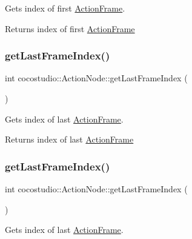Gets index of first \hyperlink{classcocostudio_1_1ActionFrame}{Action\+Frame}.

\begin{DoxyReturn}{Returns}
index of first \hyperlink{classcocostudio_1_1ActionFrame}{Action\+Frame} 
\end{DoxyReturn}
\mbox{\label{classcocostudio_1_1ActionNode_a4f5f69fc0b097ab421ce518b10f316c1}} 
\subsubsection{\texorpdfstring{get\+Last\+Frame\+Index()}{getLastFrameIndex()}\hspace{0.1cm}{\footnotesize\ttfamily [1/2]}}
{\footnotesize\ttfamily int cocostudio\+::\+Action\+Node\+::get\+Last\+Frame\+Index (\begin{DoxyParamCaption}{ }\end{DoxyParamCaption})}

Gets index of last \hyperlink{classcocostudio_1_1ActionFrame}{Action\+Frame}.

\begin{DoxyReturn}{Returns}
index of last \hyperlink{classcocostudio_1_1ActionFrame}{Action\+Frame} 
\end{DoxyReturn}
\mbox{\label{classcocostudio_1_1ActionNode_a4f5f69fc0b097ab421ce518b10f316c1}} 
\subsubsection{\texorpdfstring{get\+Last\+Frame\+Index()}{getLastFrameIndex()}\hspace{0.1cm}{\footnotesize\ttfamily [2/2]}}
{\footnotesize\ttfamily int cocostudio\+::\+Action\+Node\+::get\+Last\+Frame\+Index (\begin{DoxyParamCaption}{ }\end{DoxyParamCaption})}

Gets index of last \hyperlink{classcocostudio_1_1ActionFrame}{Action\+Frame}.

